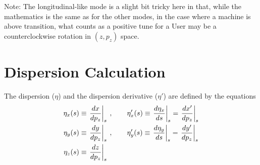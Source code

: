Note: The longitudinal-like mode is a slight bit tricky here in that, while the mathematics is the
same as for the other modes, in the case where a machine is above transition, what counts as a
positive tune for a User may be a counterclockwise rotation in $(z, p_z)$ space.

\section{Dispersion Calculation}
\label{s:dispersion}

The dispersion ($\eta$) and the dispersion derivative ($\eta'$) are defined by the equations
\begin{align}
  \eta_x(s) &\equiv \left. \frac{dx}{dp_z} \right|_s \> , \qquad
    \eta'_x(s) \equiv \left. \frac{d\eta_x}{ds} \right|_s
    = \left. \frac{dx'}{dp_z} \right|_s \nonumber \\
  \eta_y(s) &\equiv \left. \frac{dy}{dp_z} \right|_s \> , \qquad
    \eta'_y(s) \equiv \left. \frac{d\eta_y}{ds} \right|_s
    = \left. \frac{dy'}{dp_z} \right|_s \\
  \eta_z(s) &\equiv \left. \frac{dz}{dp_z} \right|_s \nonumber
\end{align}

